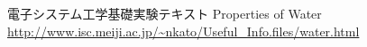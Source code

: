 
\begin{thebibliography}{99}
    \setcounter{num}{2}
    \bibitem{}電子システム工学基礎実験テキスト
    \bibitem{}Properties of Water \url{http://www.isc.meiji.ac.jp/~nkato/Useful_Info.files/water.html}
\end{thebibliography}